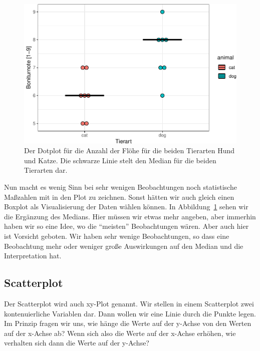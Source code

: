 \documentclass[
  letterpaper,
  DIV=11,
  oneside]{scrreport}
\begin{document}
\begin{figure}[H]

{\centering \includegraphics{./eda-ggplot_files/figure-pdf/fig-dotplot-flea-eda-1-1.pdf}

}

\caption{\label{fig-dotplot-flea-eda-1}Der Dotplot für die Anzahl der
Flöhe für die beiden Tierarten Hund und Katze. Die schwarze Linie stelt
den Median für die beiden Tierarten dar.}

\end{figure}

Nun macht es wenig Sinn bei sehr wenigen Beobachtungen noch statistische
Maßzahlen mit in den Plot zu zeichnen. Sonst hätten wir auch gleich
einen Boxplot als Visualisierung der Daten wählen können. In
Abbildung~\ref{fig-dotplot-flea-eda-1} sehen wir die Ergänzung des
Medians. Hier müssen wir etwas mehr angeben, aber immerhin haben wir so
eine Idee, wo die ``meisten'' Beobachtungen wären. Aber auch hier ist
Vorsicht geboten. Wir haben sehr wenige Beobachtungen, so dass eine
Beobachtung mehr oder weniger große Auswirkungen auf den Median und die
Interpretation hat.

\hypertarget{sec-eda-scatter}{%
\subsection{Scatterplot}\label{sec-eda-scatter}}

Der Scatterplot wird auch xy-Plot genannt. Wir stellen in einem
Scatterplot zwei kontenuierliche Variablen dar. Dann wollen wir eine
Linie durch die Punkte legen. Im Prinzip fragen wir uns, wie hänge die
Werte auf der y-Achse von den Werten auf der x-Achse ab? Wenn sich also
die Werte auf der x-Achse erhöhen, wie verhalten sich dann die Werte auf
der y-Achse?
\end{document}
